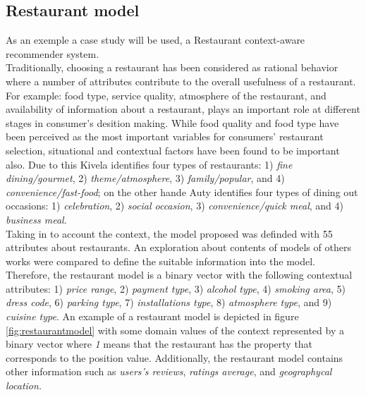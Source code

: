 \subsection{Restaurant model}
As an exemple a case study will be used, a 
Restaurant context-aware recommender system.  
\\ Traditionally, choosing
a restaurant has been considered as rational behavior where a number
of attributes contribute to the overall usefulness of a restaurant.
For example: food type, service quality, atmosphere of the restaurant,
and availability of information about a restaurant, plays an important
role at different stages in consumer's desition
making\cite{auty1992consumer}. While food quality and food type have
been perceived as the most important variables for consumers'
restaurant selection, situational and contextual factors have been
found to be important also. Due to this 
Kivela\cite{jack1997restaurant} identifies four types of restaurants:
1) \textit{fine dining/gourmet}, 2) \textit{theme/atmosphere}, 3)
\textit{family/popular}, and 4) \textit{convenience/fast-food}; on
the other hande Auty\cite{auty1992consumer} identifies four types of dining out
occasions: 1) \textit{celebration}, 2) \textit{social
occasion}, 3) \textit{convenience/quick meal}, and 4) \textit{business
meal}.\\ Taking in to account the context, the model proposed
was definded with 55 attributes
about restaurants. An exploration about contents of
models of others works were compared to define the suitable
information into the model. Therefore, the restaurant model is a
binary vector with the following contextual attributes: 1)
\textit{price range}, 2) \textit{payment type}, 3) \textit{alcohol
type}, 4) \textit{smoking area}, 5) \textit{dress code}, 6)
\textit{parking type}, 7) \textit{installations type}, 8)
\textit{atmosphere type}, and 9) \textit{cuisine type}. An example of
a restaurant model is depicted
in figure \ref{fig:restaurantmodel} with some domain values of the
context represented by a binary vector where \textit{1} means that the
restaurant has the property that corresponds to the position value.
Additionally, the restaurant model contains other information
such as \textit{users's reviews}, \textit{ratings average}, and
\textit{geographycal location.}\\
